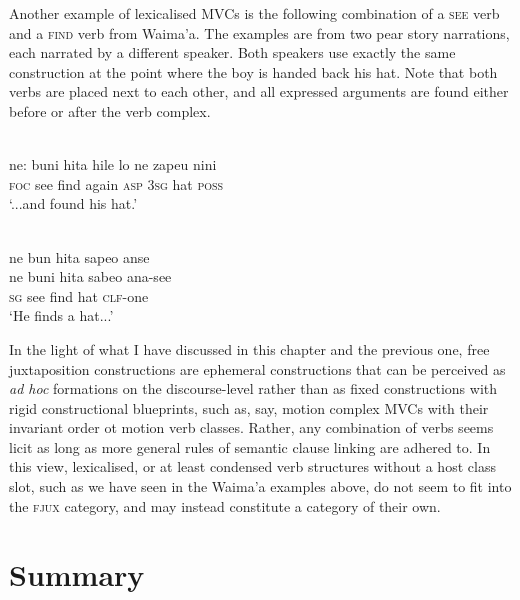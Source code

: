 Another example of lexicalised MVCs is the following combination of a \textsc{see} verb and a \textsc{find} verb from Waima'a. The examples are from two pear story narrations, each narrated by a different speaker. Both speakers use exactly the same construction at the point where the boy is handed back his hat. Note that both verbs are placed next to each other, and all expressed arguments are found either before or after the verb complex.

\ea 
{}\\
\gll ne: buni hita hile lo ne zapeu nini \\
\textsc{foc} see find again \textsc{asp} 3\textsc{sg} hat \textsc{poss} \\
\glft `...and found his hat.'\\ 
\z

\ea 
{}\\
\glll ne bun hita sapeo anse \\
ne buni hita sabeo ana-see \\
\textsc{sg} see find hat \textsc{clf}-one \\
\glft `He finds a hat...' \\ 
\z

In the light of what I have discussed in this chapter and the previous one, free juxtaposition constructions are ephemeral constructions that can be perceived as \textit{ad hoc} formations on the discourse-level rather than as fixed constructions with rigid constructional blueprints, such as, say, motion complex MVCs with their invariant order ot motion verb classes. Rather, any combination of verbs seems licit as long as more general rules of semantic clause linking are adhered to. In this view, lexicalised, or at least condensed verb structures without a host class slot, such as we have seen in the Waima'a examples above, do not seem to fit into the \textsc{fjux} category, and may instead constitute a category of their own.

\section{Summary}


